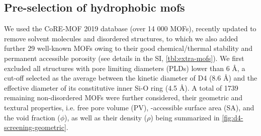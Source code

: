 \subsection{Pre-selection of hydrophobic mofs}\label{pre-screening}

We used the CoRE-MOF 2019 database \citep{chungAdvancesUpdatesAnalytics2019}
(over 14 000 MOFs), recently updated to remove solvent molecules and disordered
structures, to which we also added further 29 well-known MOFs owing to their
good chemical/thermal stability and permanent accessible porosity (see details
in the SI, \cref{tbl:extra-mofs}). We first excluded all structures with pore
limiting diameters (PLDs) lower than 6 Å, a cut-off selected as the average
between the kinetic diameter of D4 (8.6 Å) and the effective diameter of its
constitutive inner Si-O ring (4.5 Å). A total of 1739 remaining non-disordered
MOFs were further considered, their geometric and textural properties, i.e. free
pore volume (PV), -accessible surface area (SA), and the void fraction
(\(\phi\)), as well as their density (\(\rho\)) being summarized in
\cref{fig:d4-screening-geometric}.

